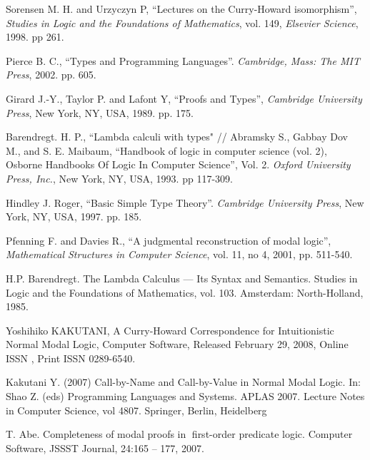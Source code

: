 \documentclass[a4paper]{article}
\begin{document}
\begin{thebibliography}{}
   Sorensen M. H. and Urzyczyn P, ``Lectures on the Curry-Howard isomorphism'',
  \textit{Studies in Logic and the Foundations of Mathematics}, vol. 149, \textit{Elsevier Science}, 1998.
  pp 261. \parskip=1mm

   Pierce B. C., ``Types and Programming Languages''. \textit{Cambridge, Mass: The MIT
  Press}, 2002. pp. 605. \parskip=1mm

   Girard J.-Y., Taylor P. and  Lafont Y, ``Proofs and Types'', \textit{Cambridge University
  Press}, New York, NY, USA, 1989. pp. 175. \parskip=1mm

   Barendregt. H. P., ``Lambda calculi with types" // Abramsky S., Gabbay Dov M., and S. E.
  Maibaum, ``Handbook of logic in computer science (vol. 2), Osborne Handbooks Of Logic In Computer
  Science'', Vol. 2. \textit{Oxford University Press, Inc.}, New York, NY, USA, 1993. pp 117-309.
  \parskip=1mm

   Hindley J. Roger, ``Basic Simple Type Theory''. \textit{Cambridge University Press}, New
  York, NY, USA, 1997. pp. 185. \parskip=1mm

   Pfenning F. and Davies R., ``A judgmental reconstruction of modal logic'',
  \textit{Mathematical Structures in Computer Science}, vol. 11, no 4, 2001, pp. 511-540. \parskip=1mm

   H.P. Barendregt. The Lambda Calculus --- Its Syntax and Semantics. Studies in Logic and
  the Foundations of Mathematics, vol. 103. Amsterdam: North-Holland, 1985.

   Yoshihiko KAKUTANI, A Curry-Howard Correspondence for Intuitionistic Normal Modal Logic, Computer Software, Released February 29, 2008, Online ISSN , Print ISSN 0289-6540.

   Kakutani Y. (2007) Call-by-Name and Call-by-Value in Normal Modal Logic. In: Shao Z. (eds) Programming Languages and Systems. APLAS 2007. Lecture Notes in Computer Science, vol 4807. Springer, Berlin, Heidelberg

   T. Abe. Completeness of modal proofs in first-order predicate logic. Computer Software, JSSST Journal, 24:165 -- 177, 2007.
  \end{thebibliography}
\end{document}
